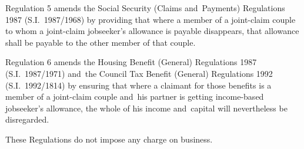\documentclass[12pt,a4paper]{article}
\begin{document}
Regulation 5 amends the Social Security (Claims and~Payments) Regulations 1987 (S.I.~1987/1968) by providing that where a member of a joint-claim couple to whom a joint-claim jobseeker’s allowance is payable disappears, that allowance shall be payable to the other member of that couple.

\enlargethispage{\baselineskip}

\begin{sloppypar}
Regulation 6 amends the Housing Benefit (General) Regulations 1987 (S.I.~1987/1971) and~the Council Tax Benefit (General) Regulations 1992 (S.I.~1992/1814) by ensuring that where a claimant for those benefits is a member of a joint-claim couple and~his partner is getting income-based jobseeker’s allowance, the whole of his income and~capital will nevertheless be disregarded.
\end{sloppypar}

These Regulations do not impose any charge on business. 
\end{document}
